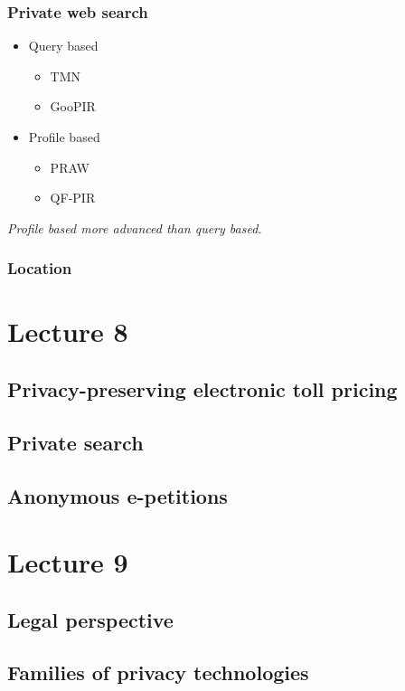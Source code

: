 \documentclass[a4paper,12pt,english]{article}
\begin{document}
\subsubsection{Private web search}
\begin{itemize}
	\item Query based
	\begin{itemize}
		\item TMN
		\item GooPIR
	\end{itemize}
	\item Profile based
	\begin{itemize}
		\item PRAW
		\item QF-PIR
	\end{itemize}
\end{itemize}
\emph{Profile based more advanced than query based.}
\subsubsection{Location}

\section{Lecture 8}
\subsection{Privacy-preserving electronic toll pricing}

\subsection{Private search}

\subsection{Anonymous e-petitions}

\section{Lecture 9}
\subsection{Legal perspective}

\subsection{Families of privacy technologies}
\end{document}
